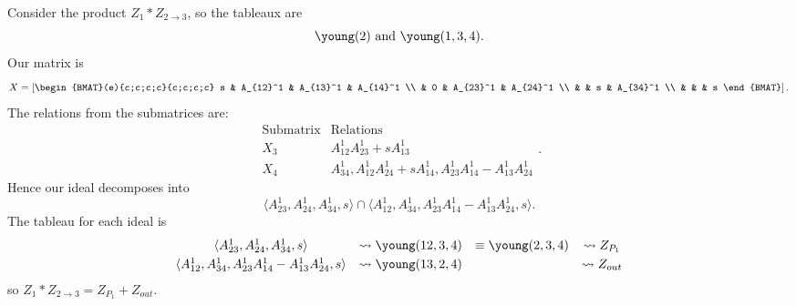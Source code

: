 \documentclass[draft]{article}
\begin{document}
\begin{example}
Consider the product $Z_1 * Z_{2 \rightarrow 3}$, so the tableaux are 
\[
\young(2) \text{ and } \young(1,3,4).
\]
Our matrix is 
\[
X = \left[\begin{BMAT}(e){c;c;c;c}{c;c;c;c}
    s & A_{12}^1 & A_{13}^1 & A_{14}^1 \\
     & 0 & A_{23}^1 & A_{24}^1 \\
     & & s & A_{34}^1 \\
     & & & s
\end{BMAT}
\right].
\]
The relations from the submatrices are:
\[
\begin{array}{c|c}
    \text{Submatrix} & \text{Relations} \\ \hline
    X_3 & A_{12}^1A_{23}^1 + sA_{13}^1 \\
    X_4 & A_{34}^1, A_{12}^1A_{24}^1 + sA_{14}^1, A_{23}^1A_{14}^1 - A_{13}^1A_{24}^1
\end{array}.
\]
Hence our ideal decomposes into 
\[
\langle A_{23}^1,A_{24}^1,A_{34}^1,s \rangle \cap \langle A_{12}^1,A_{34}^1,A_{23}^1A_{14}^1 - A_{13}^1A_{24}^1,s \rangle.
\]
The tableau for each ideal is
\[\begin{array}{cccc}\vspace{1mm}
    \langle A_{23}^1,A_{24}^1,A_{34}^1,s \rangle &\leadsto \young(12,3,4) &\equiv \young(2,3,4) &\leadsto Z_{P_1} \\ 
    \langle A_{12}^1,A_{34}^1,A_{23}^1A_{14}^1 - A_{13}^1A_{24}^1,s \rangle &\leadsto \young(13,2,4) & &\leadsto Z_{out}
\end{array}
\]
so $Z_1 * Z_{2 \rightarrow 3} = Z_{P_1} + Z_{out}$.
\end{example}
\end{document}
